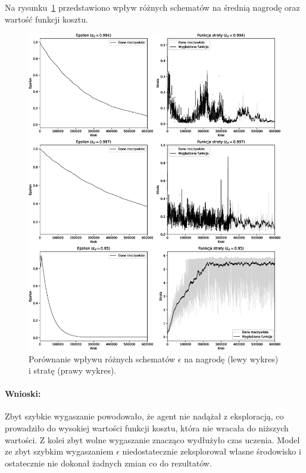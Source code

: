 Na rysunku~\ref{fig:epsilon_comparison} przedstawiono wpływ różnych schematów na średnią nagrodę oraz wartość funkcji kosztu.

\begin{figure}[!ht]
	\centering
	\includegraphics[width=\textwidth]{plots/epsilon.eps}
	\caption{Porównanie wpływu różnych schematów \(\epsilon\) na nagrodę (lewy wykres) i stratę (prawy wykres).}
	\label{fig:epsilon_comparison}
\end{figure}

\paragraph{Wnioski:}
Zbyt szybkie wygaszanie powodowało, że agent nie nadążał z eksploracją, co prowadziło do wysokiej wartości funkcji kosztu, która nie wracała do niższych wartości. Z kolei zbyt wolne wygaszanie znacząco wydłużyło czas uczenia. Model ze zbyt szybkim wygaszaniem \(\epsilon\) niedostatecznie zeksplorował własne środowisko i ostatecznie nie dokonał żadnych zmian co do rezultatów.

